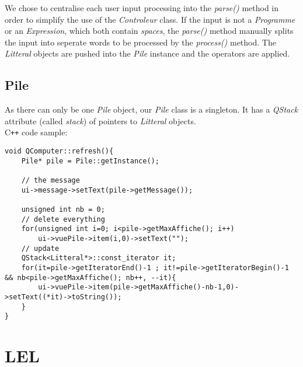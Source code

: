 \documentclass[titlepage]{article}
\begin{document}
We chose to centralise each user input processing into the \textit{parse()} method in order to simplify the use of the \textit{Controleur} class. If the input is not a \textit{Programme} or an \textit{Expression}, which both contain \textit{spaces}, the \textit{parse()} method manually splits the input into seperate words to be processed by the \textit{process()} method. The \textit{Litteral} objects are pushed into the \textit{Pile} instance and the operators are applied.

\subsection{Pile}

As there can only be one \textit{Pile} object, our \textit{Pile} class is a singleton. It has a \textit{QStack} attribute (called \textit{stack}) of pointers to \textit{Litteral} objects.\\

C\texttt{++} code sample:
\begin{lstlisting}
void QComputer::refresh(){
    Pile* pile = Pile::getInstance();

    // the message
    ui->message->setText(pile->getMessage());

    unsigned int nb = 0;
    // delete everything
    for(unsigned int i=0; i<pile->getMaxAffiche(); i++)
        ui->vuePile->item(i,0)->setText("");
    // update
    QStack<Litteral*>::const_iterator it;
    for(it=pile->getIteratorEnd()-1 ; it!=pile->getIteratorBegin()-1 && nb<pile->getMaxAffiche(); nb++, --it){
        ui->vuePile->item(pile->getMaxAffiche()-nb-1,0)->setText((*it)->toString());
    }
}
\end{lstlisting}


\section{LEL}
\end{document}

